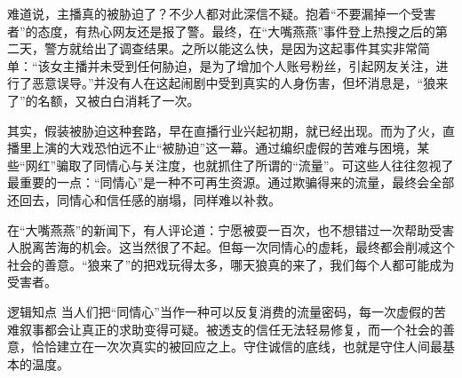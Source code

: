 难道说，主播真的被胁迫了？不少人都对此深信不疑。抱着“不要漏掉一个受害者”的态度，有热心网友还是报了警。最终，在“大嘴燕燕”事件登上热搜之后的第二天，警方就给出了调查结果。之所以能这么快，是因为这起事件其实非常简单：“该女主播并未受到任何胁迫，是为了增加个人账号粉丝，引起网友关注，进行了恶意误导。”并没有人在这起闹剧中受到真实的人身伤害，但坏消息是，“狼来了”的名额，又被白白消耗了一次。

其实，假装被胁迫这种套路，早在直播行业兴起初期，就已经出现。而为了火，直播里上演的大戏恐怕远不止“被胁迫”这一幕。通过编织虚假的苦难与困境，某些“网红”骗取了同情心与关注度，也就抓住了所谓的“流量”。可这些人往往忽视了最重要的一点：“同情心”是一种不可再生资源。通过欺骗得来的流量，最终会全部还回去，同情心和信任感的崩塌，同样难以补救。

在“大嘴燕燕”的新闻下，有人评论道：宁愿被耍一百次，也不想错过一次帮助受害人脱离苦海的机会。这当然很了不起。但每一次同情心的虚耗，最终都会削减这个社会的善意。“狼来了”的把戏玩得太多，哪天狼真的来了，我们每个人都可能成为受害者。

\begin{quoteBox}{逻辑知点}
当人们把“同情心”当作一种可以反复消费的流量密码，每一次虚假的苦难叙事都会让真正的求助变得可疑。被透支的信任无法轻易修复，而一个社会的善意，恰恰建立在一次次真实的被回应之上。守住诚信的底线，也就是守住人间最基本的温度。
\end{quoteBox}
